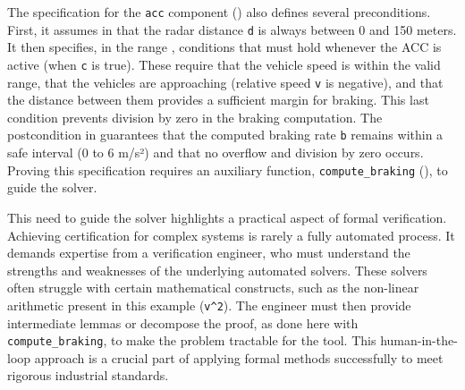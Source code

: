 The specification for the \texttt{acc} component ()
also defines several preconditions. First, it assumes in
 that the radar distance \texttt{d} is always
between 0 and 150 meters. It then specifies, in the range
,
conditions that must hold whenever the ACC is active (\ie when \texttt{c} is true).
These require that the vehicle speed is within the valid range, that the vehicles are
approaching (relative speed \texttt{v} is negative), and that the distance between
them provides a sufficient margin for braking. This last condition prevents division
by zero in the braking computation. The postcondition in
 guarantees that the computed braking rate
\texttt{b} remains within a safe interval (0 to 6 m/s²) and that no overflow and division by zero
occurs.
Proving this specification requires an auxiliary function, \texttt{compute\_braking}
(),
to guide the solver.

This need to guide the solver highlights a practical aspect of formal verification.
Achieving certification for complex systems is rarely a fully automated process. It
demands expertise from a verification engineer, who must understand the strengths and
weaknesses of the underlying automated solvers. These solvers often struggle with
certain mathematical constructs, such as the non-linear arithmetic present in this
example (\texttt{v\^{}2}). The engineer must then provide intermediate lemmas or decompose
the proof, as done here with \texttt{compute\_braking}, to make the problem tractable
for the tool. This human-in-the-loop approach is a crucial part of applying formal
methods successfully to meet rigorous industrial standards.

